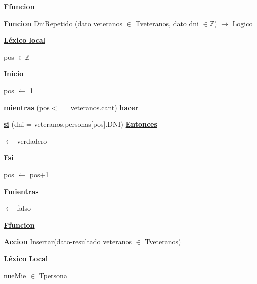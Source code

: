 \documentclass{article}
\begin{document}
    \hspace{4mm}\underline{\textbf{Ffuncion}}

    \vspace{4mm}

    \hspace{4mm}\underline{\textbf{Funcion}} DniRepetido (dato veteranos $\in$ Tveteranos, dato dni $\in \mathbb{Z}$) $\rightarrow$ Logico

        \hspace{8mm}\underline{\textbf{Léxico local}}

            \hspace{12mm}pos $\in \mathbb{Z}$

        \hspace{8mm}\underline{\textbf{Inicio}}

            \hspace{12mm}pos $\leftarrow$ 1

            \hspace{12mm}\underline{\textbf{mientras}} (pos$<=$ veteranos.cant) \underline{\textbf{hacer}}

                \hspace{16mm}\underline{\textbf{si}} (dni = veteranos.personas[pos].DNI) \underline{\textbf{Entonces}}

                    \hspace{20mm}$\leftarrow$ verdadero

                \hspace{16mm}\underline{\textbf{Fsi}}

                \hspace{16mm}pos $\leftarrow$ pos+1
                
            \hspace{12mm}\underline{\textbf{Fmientras}}

            \hspace{12mm}$\leftarrow$ falso
    
    \hspace{4mm}\underline{\textbf{Ffuncion}}

    \vspace{4mm}

    \hspace{4mm}\underline{\textbf{Accion}} Insertar(dato-resultado veteranos $\in$ Tveteranos)

        \hspace{8mm}\underline{\textbf{Léxico Local}}

            \hspace{12mm}nueMie $\in$ Tpersona
\end{document}
